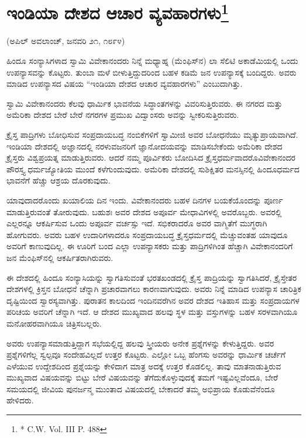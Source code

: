 \section[ಇಂಡಿಯಾ ದೇಶದ ಆಚಾರ ವ್ಯವಹಾರಗಳು]{ಇಂಡಿಯಾ ದೇಶದ ಆಚಾರ ವ್ಯವಹಾರಗಳು\protect\footnote{* C.W. Vol. III P. 488}}

\begin{center}
(ಅಪಿಲ್​ ಅವಲಾಂಚ್​, ಜನವರಿ ೨೧, ೧೮೯೪)
\end{center}

ಹಿಂದೂ ಸಂನ್ಯಾಸಿಗಳಾದ ಸ್ವಾಮಿ ವಿವೇಕಾನಂದರು ನಿನ್ನೆ ಮಧ್ಯಾಹ್ನ (ಮೆಂಫಿಸ್​ನ) ಲಾ ಸೆಲಿಟಿ ಅಕಾಡೆಮಿಯಲ್ಲಿ ಒಂದು ಉಪನ್ಯಾಸವನ್ನು ಕೊಟ್ಟರು. ತುಂಬಾ ಮಳೆ ಬೀಳುತ್ತಿದ್ದುದರಿಂದ ಬಹಳ ಕಡಿಮೆ ಜನ ಉಪನ್ಯಾಸಕ್ಕೆ ಬಂದಿದ್ದರು. ಅವರು ಮಾಡಿದ ಉಪನ್ಯಾಸದ ವಿಷಯ “ಇಂಡಿಯಾ ದೇಶದ ಆಚಾರ ವ್ಯವಹಾರಗಳು” ಎಂಬುದಾಗಿತ್ತು.

ಸ್ವಾಮಿ ವಿವೇಕಾನಂದರು ಕೆಲವು ಧಾರ್ಮಿಕ ಭಾವನೆಯ ಸಿದ್ಧಾಂತಗಳನ್ನು ವಿವರಿಸು\break ತ್ತಿರುವರು. ಈ ನಗರದ ಮತ್ತು ಅಮೆರಿಕಾ ದೇಶದ ಬೇರೆ ಬೇರೆ ನಗರಗಳ ಪ್ರಮುಖ ವಿದ್ವಾಂಸರು ಅವನ್ನು ಸ್ವೀಕರಿಸುತ್ತಿರುವರು.

ಕ್ರೈಸ್ತ ಪಾದ್ರಿಗಳು ಬೋಧಿಸುವ ಸಂಪ್ರದಾಯಬದ್ಧ ನಂಬಿಕೆಗಳಿಗೆ ಸ್ವಾಮೀಜಿ ಅವರ ಬೋಧನೆಯು ಮೃತ್ಯುಪ್ರಾಯವಾಗಿದೆ. ಇಂಡಿಯಾ ದೇಶದಲ್ಲಿ ಅಜ್ಞಾನದಲ್ಲಿ ನರಳುವ\break ಜನರಿಗೆ ಜ್ಞಾನೋದಯವನ್ನು ಮಾಡಿಸಬೇಕೆಂದು ಅಮೆರಿಕಾ ದೇಶದ ಕ್ರೈಸ್ತರು ವಿಶ್ವಪ್ರಯತ್ನ ಮಾಡುತ್ತಿರುವರು. ಆದರೆ ನಮ್ಮ ಪೂರ್ವಿಕರು ಬೋದಿಸಿದ ಕ್ರೈಸ್ತಧರ್ಮವಾದರೊ\break ವಿವೇಕಾನಂದರ ಪೌರಸ್ತ್ಯ ಧರ್ಮಜ್ಯೋತಿಯ ಮುಂದೆ ಕಳೆಗುಂದುವುದು. ಅಮೆರಿಕಾ ದೇಶದಲ್ಲಿ ಸುಶಿಕ್ಷಿತರ ಮನಸ್ಸಿನಲ್ಲಿ ಹಿಂದೂಧರ್ಮದ ಭಾವನೆಗೆ ಹೆಚ್ಚು ಆಶ್ರಯ ದೊರಕುವುದು.

ಯಾವುದಾದರೊಂದು ಖಯಾಲಿಯ ದಿನ ಇಂದು. ವಿವೇಕಾನಂದರು ಬಹಳ ದಿನಗಳ ಬಯಕೆಯೊಂದನ್ನು ಪೂರ್ಣ ಮಾಡುತ್ತಿರುವಂತೆ ತೋರುವುದು. ಬಹುಶಃ ಅವರ ದೇಶದ ಅಪೂರ್ವ ಮೇಧಾವಿಗಳಲ್ಲಿ ಅವರೊಬ್ಬರು. ಅವರಲ್ಲಿ ಎಲ್ಲರನ್ನೂ ಆಕರ್ಷಿಸುವ ಒಂದು ಅಪೂರ್ವ ವರ್ಚಸ್ಸು ಇದೆ. ಸಭಿಕರಾದರೊ ಅವರ ವಾಗ್ಮಿತೆಗೆ ಮುಗ್ಧರಾಗಿ ಹೋಗುವರು. ಅವರು ಬಹಳ ಉದಾರಿಗಳಾದರೂ ಸಂಪ್ರದಾಯಬದ್ಧ ಕ್ರೈಸ್ತಧರ್ಮದಲ್ಲಿ ಮೆಚ್ಚುವಂತಹ ಯಾವುದೂ ಅವರಿಗೆ ಕಾಣುವುದಿಲ್ಲ. ಈ ಊರಿಗೆ ಬಂದ ಎಲ್ಲಾ ಉಪನ್ಯಾಸಕರು ಮತ್ತು ಪಾದ್ರಿಗಳಿಗಿಂತ ಹೆಚ್ಚಾಗಿ ವಿವೇಕಾನಂದರಿಗೆ ಜನ ಮೆಂಫಿಸ್​ನಲ್ಲಿ ಆಕರ್ಷಿತರಾಗಿರುವರು.

ಈ ದೇಶದಲ್ಲಿ ಹಿಂದೂ ಸಂನ್ಯಾಸಿಯನ್ನು ಸ್ವಾಗತಿಸುವಂತೆ ಭರತಖಂಡದಲ್ಲಿ ಕ್ರೈಸ್ತ ಪಾದ್ರಿಯನ್ನು ಸ್ವಾಗತಿಸಿದರೆ, ಕ್ರೈಸ್ತೇತರ ದೇಶಗಳಲ್ಲಿ ಕ್ರಿಸ್ತನ ಬೋಧನೆ ಚೆನ್ನಾಗಿ ಪ್ರಚಾರ\break ವಾಗಲು ಕಾರಣವಾಗುವುದು. ಅವರು ನಿನ್ನೆ ಮಾಡಿದ ಉಪನ್ಯಾಸ ಚಾರಿತ್ರಿಕ ದೃಷ್ಟಿಯಿಂದ ಸ್ವಾರಸ್ಯವಾಗಿತ್ತು. ಪುರಾತನ ಕಾಲದಿಂದ ಇಂದಿನವರೆಗಿನ ಅವರ ದೇಶದ ಇತಿಹಾಸ ಮತ್ತು ಸಂಪ್ರದಾಯಗಳ ಪರಿಚಯ ಅವರಿಗೆ ಚೆನ್ನಾಗಿ ಇದೆ. ಆ ದೇಶದ ಮುಖ್ಯವಾದ ಹಲವು ಸ್ಥಳ ಮತ್ತು ವಸ್ತುಗಳನ್ನು ಬಹಳ ಸರಳವಾಗಿಯೂ ಮನೋಹರವಾಗಿಯೂ ಚಿತ್ರಿಸಬಲ್ಲರು.

ಅವರು ಉಪನ್ಯಾಸಮಾಡುತ್ತಿದ್ದಾಗ ಸಭೆಯಲ್ಲಿದ್ದ ಹಲವು ಸ್ತ್ರೀಯರು ಅನೇಕ ಪ್ರಶ್ನೆಗಳನ್ನು ಕೇಳುತ್ತಿದ್ದರು. ಅವರ ಪ್ರಶ್ನೆಗಳಿಗೆಲ್ಲ ಸ್ವಲ್ಪವೂ ಸಂದೇಹವಿಲ್ಲದೆ ಉತ್ತರ ಕೊಟ್ಟರು. ಎಲ್ಲೋ ಒಬ್ಬ ಹೆಂಗಸು ಅವರನ್ನು ಧಾರ್ಮಿಕ ಚರ್ಚೆಗೆ ಎಳೆಯುವ ಉದ್ದೇಶದಿಂದ ಪ್ರಶ್ನೆಯನ್ನು ಕೇಳಿದಾಗ ಮಾತ್ರ ಅದಕ್ಕೆ ಉತ್ತರ ಕೊಡಲಿಲ್ಲ. ತಾವು ಮಾತನಾಡುತ್ತಿರುವ ಮುಖ್ಯವಾದ ವಿಷಯವನ್ನು ಬಿಟ್ಟು ಬೇರೆ ವಿಷಯವನ್ನು ತೆಗೆದುಕೊಳ್ಳುವುದಕ್ಕೆ ತಮಗೆ ಇಷ್ಟವಿಲ್ಲವೆಂದೂ, ಬೇರೆ ಸಮಯದಲ್ಲಿ ಜೀವಿಯ ಪುನರ್ಜನ್ಮ ಮುಂತಾದ ವಿಷಯದಲ್ಲಿ ಬೇಕಾದರೆ ತಮ್ಮ ಅಭಿಪ್ರಾಯ ಕೊಡುವೆನೆಂದೂ ಹೇಳಿದರು.

